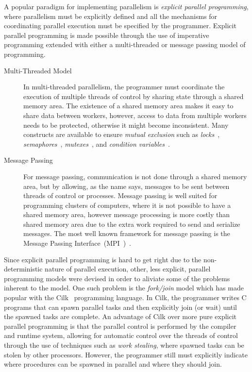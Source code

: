 A popular paradigm for implementing parallelism is \emph{explicit parallel
programming}, where parallelism must be explicitly defined and all the
mechanisms for coordinating parallel execution must be specified by the
programmer. Explicit parallel programming is made possible through the use of
imperative programming extended with either a multi-threaded or message passing
model of programming.

\begin{description}

   \item[Multi-Threaded Model] In multi-threaded parallelism, the programmer
      must coordinate the execution of multiple threads of control by sharing
      state through a shared memory area. The existence of a shared memory area
      makes it easy to share data between workers, however, access to data from
      multiple workers needs to be protected, otherwise it might become
      inconsistent. Many constructs are available to ensure \emph{mutual
      exclusion} such as \emph{locks}~\cite{Silberschatz:2008},
      \emph{semaphores}~\cite{Dijkstra:2002},
      \emph{mutexes}~\cite{Silberschatz:2008}, and \emph{condition
      variables}~\cite{Hoare:1974}.

   \item[Message Passing] For message passing, communication is not done through a
      shared memory area, but by allowing, as the name says, messages to be sent
      between threads of control or processes. Message passing is well suited for
      programming clusters of computers, where it is not possible to have a shared
      memory area, however message processing is more costly than shared memory
      area due to the extra work required to send and serialize messages.  The most
      well known framework for message passing is the Message Passing
      Interface~(MPI~)~\cite{Forum:1994}.

\end{description}


Since explicit parallel programming is hard to get right due to the
non-deterministic nature of parallel execution, other, less explicit, parallel
programming models were devised in order to aliviate some of the problems
inherent to the model. One such problem is the \emph{fork/join} model which has
made popular with the Cilk~\cite{Blumofe:1995:CEM:209936.209958} programming
language. In Cilk, the programmer writes C programs that can spawn parallel
tasks and then explicitly join (or wait) until the spawned tasks are complete.
An advantage of Cilk over more pure explicit parallel programming is that the
parallel control is performed by the compiler and runtime system, allowing for
automatic control over the threads of control through the use of techniques such
as \emph{work stealing}, where spawned tasks can be stolen by other processors.
However, the programmer still must explicitly indicate where procedures can be
spawned in parallel and where they should join.

